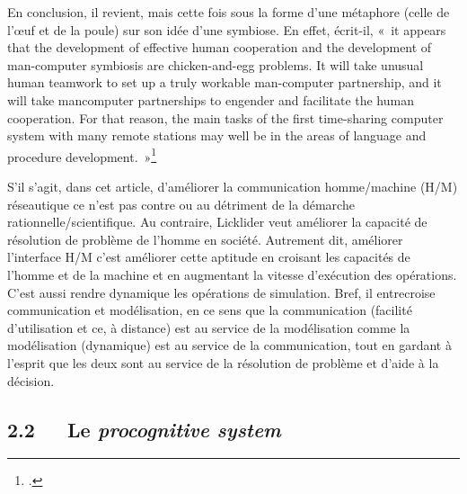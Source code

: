 \documentclass{FramateX}
\begin{document}
\begin{refsection}
En conclusion, il revient, mais cette fois sous la forme d'une métaphore
(celle de l'œuf et de la poule) sur son idée d'une symbiose. En effet,
écrit-il, «~it appears that the development of effective human
cooperation and the development of man-computer symbiosis are
{\textquotedbl}chicken-and-egg{\textquotedbl} problems. It will take
unusual human teamwork to set up a truly workable man-computer
partnership, and it will take mancomputer partnerships to engender and
facilitate the human cooperation. For that reason, the main tasks of
the first time-sharing computer system with many remote stations may
well be in the areas of language and procedure development.~»\footnote{\cite[p.~119]{lickliderline1962}.}


S'il s'agit, dans cet article, d'améliorer la communication
homme/machine (H/M) réseautique ce n'est pas contre ou au détriment de
la démarche rationnelle/scientifique. Au contraire, Licklider veut
améliorer la capacité de résolution de problème de l'homme en société.
Autrement dit, améliorer l'interface H/M c'est améliorer cette aptitude
en croisant les capacités de l'homme et de la machine et en augmentant
la vitesse d'exécution des opérations. C'est aussi rendre dynamique les
opérations de simulation. Bref, il entrecroise communication et
modélisation, en ce sens que la communication (facilité d'utilisation
et ce, à distance) est au service de la modélisation comme la
modélisation (dynamique) est au service de la communication, tout en
gardant à l'esprit que les deux sont au service de la résolution de
problème et d'aide à la décision. 

\subsection*{2.2~~~Le \textit{procognitive system}}
{}


\end{refsection}
\end{document}
